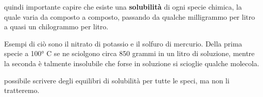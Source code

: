 \E quindi importante capire che esiste una \textbf{solubilità} di ogni specie chimica, la quale varia da composto a composto, passando da qualche milligrammo per litro a quasi un chilogrammo per litro.

Esempi di ciò sono il nitrato di potassio e il solfuro di mercurio. Della prima specie a 100° C se ne sciolgono circa 850 grammi in un litro di soluzione, mentre la seconda è talmente insolubile che forse in soluzione si scioglie qualche molecola.

\E possibile scrivere degli equilibri di solubilità per tutte le speci, ma non li tratteremo.
